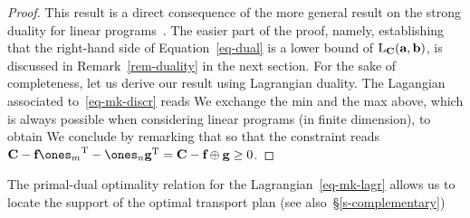 \begin{proof}
This result is a direct consequence of the more general result on the strong duality for linear programs~\citep[p. 148, Theo. 4.4]{bertsimas1997introduction}. The easier part of the proof, namely, establishing that the right-hand side of Equation~\eqref{eq-dual} is a lower bound of $\mathrm{L}_{\mathrm{\textbf{C}}}(\mathrm{\textbf{a}},\mathrm{\textbf{b}})$, is discussed in Remark~\ref{rem-duality} in the next section.
%
For the sake of completeness, let us derive our result using Lagrangian duality. The Lagangian associated to~\eqref{eq-mk-discr} reads
We exchange the min and the max above, which is always possible when considering linear programs (in finite dimension), to obtain
We conclude by remarking that
so that the constraint reads $\C - \fD\transp{\ones_m} - \ones_n \transp{\gD} = \C-\fD\oplus \gD \geq 0$.
\end{proof}

The primal-dual optimality relation for the Lagrangian~\eqref{eq-mk-lagr} allows us to locate the support of the optimal transport plan (see also~\S\ref{s-complementary})


